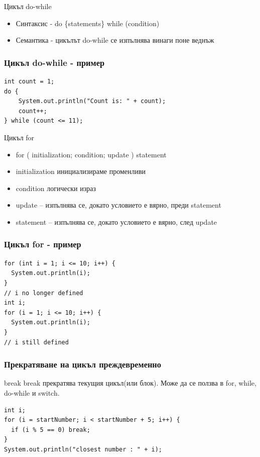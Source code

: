 \documentclass{beamer}
\begin{document}
\begin{frame}{Цикъл do-while}
  \transdissolve
  \begin{itemize}
  \item Синтаксис - do \{statements\} while (condition)
  \item Семантика - цикълът do-while се изпълнява винаги поне веднъж
  \end{itemize}
\end{frame}

\begin{frame}[fragile]
  \frametitle{Цикъл do-while - пример}
  \transdissolve
\begin{lstlisting}
int count = 1;
do {
    System.out.println("Count is: " + count);
    count++;
} while (count <= 11);
\end{lstlisting}
\end{frame}

\begin{frame}{Цикъл for}
  \transdissolve
  \begin{itemize}
  \item for ( initialization; condition; update )  {statement}
  \item initialization инициализираме променливи
  \item condition логически израз
  \item update – изпълнява се, докато
    условието е вярно, преди statement
  \item statement – изпълнява се, докато
    условието е вярно, след update
  \end{itemize}
\end{frame}

\begin{frame}[fragile]
  \frametitle{Цикъл for - пример}
  \transdissolve
\begin{lstlisting}
for (int i = 1; i <= 10; i++) {
  System.out.println(i);
}
// i no longer defined
int i;
for (i = 1; i <= 10; i++) {
  System.out.println(i);
}
// i still defined
\end{lstlisting}
\end{frame}

\begin{frame}[fragile]
  \frametitle{Прекратяване на цикъл преждевременно}
  \transdissolve
  \transdissolve
  \begin{block}{break}
    break прекратява текущия цикъл(или блок). Може
    да се ползва в for, while, do-while и
    switch.
  \end{block}
\begin{lstlisting}
int i;
for (i = startNumber; i < startNumber + 5; i++) {
  if (i % 5 == 0) break; 
}
System.out.println("closest number : " + i);
\end{lstlisting}
\end{frame}
\end{document}
